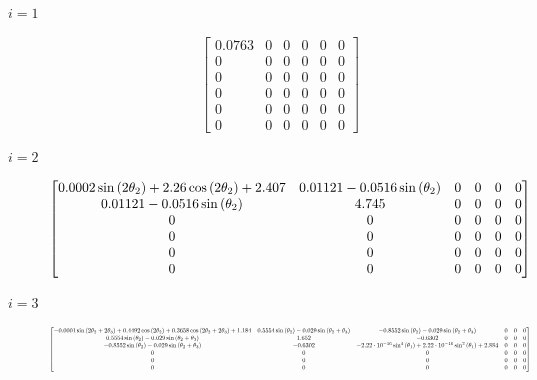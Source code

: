 \documentclass[journal]{new-aiaa}
\begin{document}
\begin{description}
    \item[$i=1$] \hfill
    $$
    \left[\begin{matrix}0.0763 & 0 & 0 & 0 & 0 & 0\\0 & 0 & 0 & 0 & 0 & 0\\0 & 0 & 0 & 0 & 0 & 0\\0 & 0 & 0 & 0 & 0 & 0\\0 & 0 & 0 & 0 & 0 & 0\\0 & 0 & 0 & 0 & 0 & 0\end{matrix}\right]
    $$ 

    \item[$i=2$] \hfill
    \[
        \resizebox{\textwidth}{!}{$
        \left[\begin{matrix}0.0002 \sin{\left(2 \theta_{2} \right)} + 2.26 \cos{\left(2 \theta_{2} \right)} + 2.407 & 0.01121 - 0.0516 \sin{\left(\theta_{2} \right)} & 0 & 0 & 0 & 0\\0.01121 - 0.0516 \sin{\left(\theta_{2} \right)} & 4.745 & 0 & 0 & 0 & 0\\0 & 0 & 0 & 0 & 0 & 0\\0 & 0 & 0 & 0 & 0 & 0\\0 & 0 & 0 & 0 & 0 & 0\\0 & 0 & 0 & 0 & 0 & 0\end{matrix}\right]
        $}
    \]

    \item[$i=3$] \hfill
    \[
        \resizebox{\textwidth}{!}{$
        \left[\begin{matrix}- 0.0001 \sin{\left(2 \theta_{2} + 2 \theta_{3} \right)} + 0.4492 \cos{\left(2 \theta_{2} \right)} + 0.3658 \cos{\left(2 \theta_{2} + 2 \theta_{3} \right)} + 1.184 & 0.5554 \sin{\left(\theta_{2} \right)} - 0.029 \sin{\left(\theta_{2} + \theta_{3} \right)} & - 0.8552 \sin{\left(\theta_{2} \right)} - 0.029 \sin{\left(\theta_{2} + \theta_{3} \right)} & 0 & 0 & 0\\0.5554 \sin{\left(\theta_{2} \right)} - 0.029 \sin{\left(\theta_{2} + \theta_{3} \right)} & 1.652 & -0.6302 & 0 & 0 & 0\\- 0.8552 \sin{\left(\theta_{2} \right)} - 0.029 \sin{\left(\theta_{2} + \theta_{3} \right)} & -0.6302 & - 2.22 \cdot 10^{-16} \sin^{4}{\left(\theta_{1} \right)} + 2.22 \cdot 10^{-16} \sin^{2}{\left(\theta_{1} \right)} + 2.884 & 0 & 0 & 0\\0 & 0 & 0 & 0 & 0 & 0\\0 & 0 & 0 & 0 & 0 & 0\\0 & 0 & 0 & 0 & 0 & 0\end{matrix}\right]
        $}
    \]


\end{description}
\end{document}
